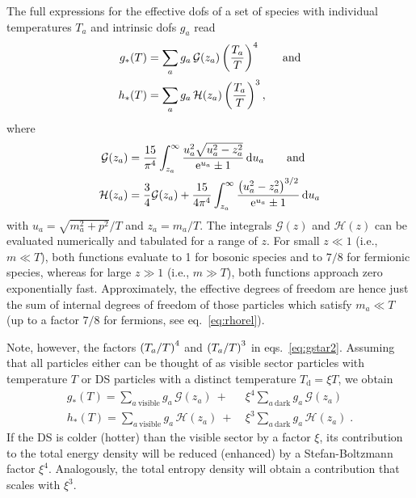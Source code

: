 The full expressions for the effective  \acp{dof} of a set of species with individual temperatures $T_a$ and intrinsic \acp{dof} $g_a$ read~\cite{Husdal:2016haj}
\begin{subequations}
	\label{eq:gstar2}
	\begin{align}
		g_*(T) & = \sum_a g_a  \, \mathcal{G}(z_a)  \left( \frac{T_a}{T} \right)^4 \qquad \text{and}\\ 
		h_*(T)	&=  \sum_a g_a  \,   \mathcal{H}(z_a) \left( \frac{T_a}{T} \right)^3  , 
	\end{align}
\end{subequations}
where 
\begin{subequations}
	\begin{align}
		\mathcal{G}(z_a) &= \frac{15}{\pi^4} \int_{z_a}^\infty  \frac{u_a^2 \sqrt{u^2_a - z^2_a}}{\mathrm{e}^{u_a} \pm 1} \mathop{}\!\mathrm{d} u_a \qquad \text{and}\\
		\mathcal{H}(z_a) &= \frac{3}{4} \mathcal{G}(z_a) +  \frac{15}{4 \pi^4} \int_{z_a}^\infty  \frac{ \left( u^2_a - z^2_a \right)^{3/2}}{\mathrm{e}^{u_a} \pm 1} \mathop{}\!\mathrm{d} u_a
	\end{align}
\end{subequations}
with $u_a = \sqrt{m_a^2 + p^2}/T$ and $z_a = m_a /T$. The integrals $\mathcal{G}(z)$ and $\mathcal{H}(z)$ can be evaluated numerically and tabulated for a range of $z$. For small $z \ll 1$ (i.e., $m \ll T$), both functions evaluate to 1 for bosonic species and to $7/8$ for fermionic species, whereas for large $z \gg 1$  (i.e., $m \gg T$), both functions approach zero exponentially fast.  Approximately, the effective degrees of freedom are hence just the sum of internal degrees of freedom of those particles which satisfy $m_a \ll T$ (up to a factor $7/8$ for fermions, see eq.~\eqref{eq:rhorel}).

Note, however, the factors $\left( T_a / T \right)^4$ and $\left( T_a / T \right)^3$ in eqs.~\eqref{eq:gstar2}.  Assuming that all particles either can be thought of as visible sector particles with temperature $T$ or \ac{DS} particles with a distinct temperature $T_\text{d} = \xi T$, we obtain
\begin{subequations}
	\label{eq:gstar3}
	\begin{align}
	g_*(T) = \sum_{a \ \text{visible}} g_a  \, \mathcal{G}(z_a) ~ + &~\xi^4 \sum_{a \ \text{dark}} g_a  \, \mathcal{G}(z_a)  \label{eq:gstar}\\
	h_*(T) = \sum_{a \ \text{visible}} g_a  \, \mathcal{H}(z_a) ~ + &~\xi^3 \sum_{a \ \text{dark}} g_a  \, \mathcal{H}(z_a)  \label{eq:hstar} \; .
	\end{align}
\end{subequations}
If the \ac{DS} is colder (hotter) than the visible sector by a factor $\xi$, its contribution to the total energy density will be reduced (enhanced) by a Stefan-Boltzmann factor $\xi^4$. Analogously, the total entropy density will obtain a contribution that scales with $\xi^3$.

